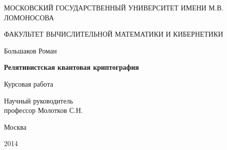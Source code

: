 \begin{titlepage}
  \centerline{МОСКОВСКИЙ ГОСУДАРСТВЕННЫЙ УНИВЕРСИТЕТ ИМЕНИ М.В. ЛОМОНОСОВА}
  \centerline{ФАКУЛЬТЕТ ВЫЧИСЛИТЕЛЬНОЙ МАТЕМАТИКИ И КИБЕРНЕТИКИ}
  \centerline{\hfill\hrulefill\hrulefill\hfill}
  \vfill
  \vfill
  \vfill
  \large
  \centerline{Большаков Роман}
  \vfill
  \Large
  \begin{center}
  {\bf{Релятивистская квантовая криптография}}
  \end{center}
  \normalsize
  \vfill
  \vfill
  \centerline{Курсовая работа}
  \vfill
  \vfill
  \begin{flushright}
  Научный руководитель\\
  профессор Молотков С.Н.
  \end{flushright}
  \vfill
  \vfill
  \centerline{Москва}
  \centerline{2014}
  \end{titlepage}